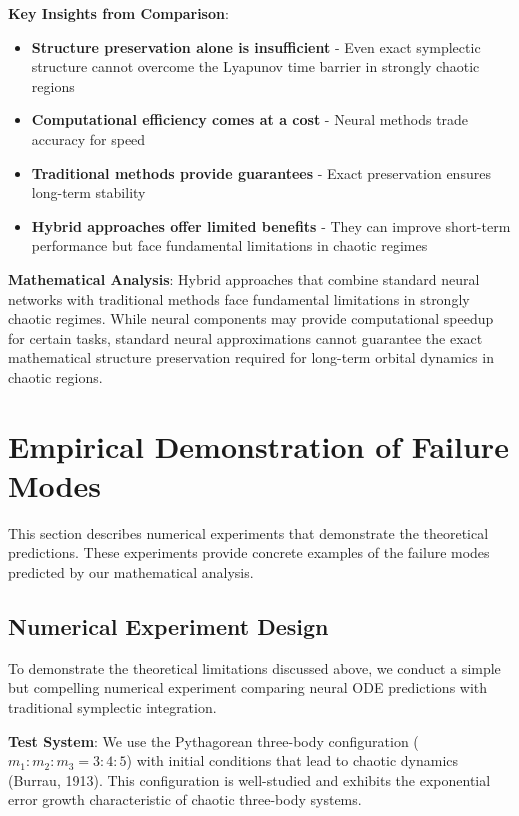 \documentclass[11pt,a4paper]{article}
\begin{document}
\vspace{0.5cm}

\textbf{Key Insights from Comparison}:
\begin{itemize}
    \item \textbf{Structure preservation alone is insufficient} - Even exact symplectic structure cannot overcome the Lyapunov time barrier in strongly chaotic regions
    \item \textbf{Computational efficiency comes at a cost} - Neural methods trade accuracy for speed
    \item \textbf{Traditional methods provide guarantees} - Exact preservation ensures long-term stability
    \item \textbf{Hybrid approaches offer limited benefits} - They can improve short-term performance but face fundamental limitations in chaotic regimes
\end{itemize}

\textbf{Mathematical Analysis}: Hybrid approaches that combine standard neural networks with traditional methods face fundamental limitations in strongly chaotic regimes. While neural components may provide computational speedup for certain tasks, standard neural approximations cannot guarantee the exact mathematical structure preservation required for long-term orbital dynamics in chaotic regions.

\section{Empirical Demonstration of Failure Modes}

This section describes numerical experiments that demonstrate the theoretical predictions. These experiments provide concrete examples of the failure modes predicted by our mathematical analysis.

\subsection{Numerical Experiment Design}

To demonstrate the theoretical limitations discussed above, we conduct a simple but compelling numerical experiment comparing neural ODE predictions with traditional symplectic integration.

\textbf{Test System}: We use the Pythagorean three-body configuration ($m_1:m_2:m_3 = 3:4:5$) with initial conditions that lead to chaotic dynamics (Burrau, 1913). This configuration is well-studied and exhibits the exponential error growth characteristic of chaotic three-body systems.
\end{document}
